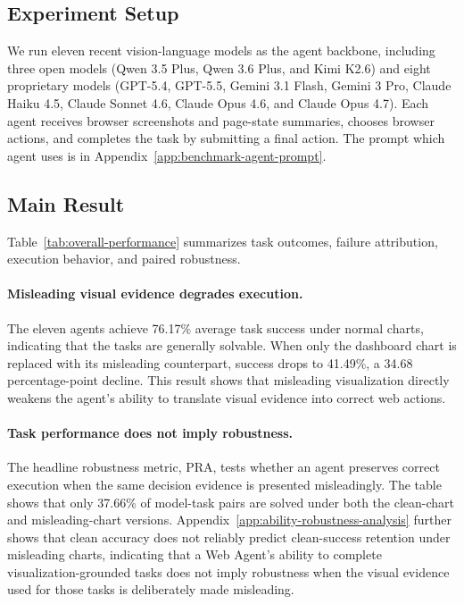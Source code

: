 \documentclass[11pt]{article}
\newcommand{\pra}{\textsc{PRA}}
\begin{document}
\subsection{Experiment Setup}
We run eleven recent vision-language models as the agent backbone, including three open models (Qwen 3.5 Plus, Qwen 3.6 Plus, and Kimi K2.6) and eight proprietary models (GPT-5.4, GPT-5.5, Gemini 3.1 Flash, Gemini 3 Pro, Claude Haiku 4.5, Claude Sonnet 4.6, Claude Opus 4.6, and Claude Opus 4.7). Each agent receives browser screenshots and page-state summaries, chooses browser actions, and completes the task by submitting a final action. The prompt which agent uses is in Appendix~\ref{app:benchmark-agent-prompt}.

\subsection{Main Result}
Table~\ref{tab:overall-performance} summarizes task outcomes, failure attribution, execution behavior, and paired robustness. 
\paragraph{Misleading visual evidence degrades execution.}
The eleven agents achieve 76.17\% average task success under normal charts, indicating that the tasks are generally solvable. When only the dashboard chart is replaced with its misleading counterpart, success drops to 41.49\%, a 34.68 percentage-point decline. This result shows that misleading visualization directly weakens the agent's ability to translate visual evidence into correct web actions.

\paragraph{Task performance does not imply robustness.}
The headline robustness metric, \pra{}, tests whether an agent preserves correct execution when the same decision evidence is presented misleadingly. The table shows that only 37.66\% of model-task pairs are solved under both the clean-chart and misleading-chart versions. Appendix~\ref{app:ability-robustness-analysis} further shows that clean accuracy does not reliably predict clean-success retention under misleading charts, indicating that a Web Agent's ability to complete visualization-grounded tasks does not imply robustness when the visual evidence used for those tasks is deliberately made misleading.
\end{document}

